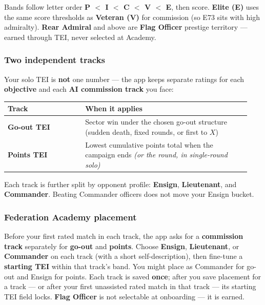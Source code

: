 \documentclass[11pt]{article}
\begin{document}
Bands follow letter order \textbf{P $<$ I $<$ C $<$ V $<$ E}, then score.
\textbf{Elite (E)} uses the same score thresholds as \textbf{Veteran
(V)} for commission (so E73 sits with high admiralty).
\textbf{Rear Admiral} and above are \textbf{Flag Officer} prestige
territory --- earned through TEI, never selected at Academy.

\subsubsection{Two independent tracks}\label{two-independent-tracks}

Your solo TEI is \textbf{not} one number --- the app keeps separate
ratings for each \textbf{objective} and each \textbf{AI commission track}
you face:

\begin{longtable}[]{@{}>{\raggedright\arraybackslash}p{0.30\linewidth}>{\raggedright\arraybackslash}p{0.64\linewidth}@{}}
\toprule\noalign{}
Track & When it applies \\
\midrule\noalign{}
\endhead
\bottomrule\noalign{}
\endlastfoot
\textbf{Go-out TEI} & Sector win under the chosen go-out structure
(sudden death, fixed rounds, or first to $X$) \\
\textbf{Points TEI} & Lowest cumulative points total when the campaign
ends \emph{(or the round, in single-round solo)} \\
\end{longtable}

Each track is further split by opponent profile: \textbf{Ensign},
\textbf{Lieutenant}, and \textbf{Commander}. Beating Commander officers
does not move your Ensign bucket.

\subsubsection{Federation Academy
placement}\label{federation-academy-placement}

Before your first rated match in each track, the app asks for a
\textbf{commission track} separately for \textbf{go-out} and
\textbf{points}. Choose \textbf{Ensign}, \textbf{Lieutenant}, or
\textbf{Commander} on each track (with a short self-description), then
fine-tune a \textbf{starting TEI} within that track's band. You might
place as Commander for go-out and Ensign for points. Each track is
saved \textbf{once}; after you save placement for a track --- or after
your first unassisted rated match in that track --- its starting TEI
field locks. \textbf{Flag Officer} is not selectable at onboarding --- it is
earned.
\end{document}
